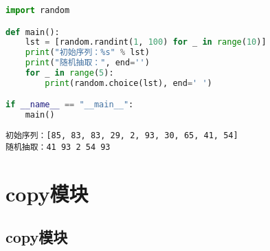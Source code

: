 \begin{table}[H]
	\centering
	\caption{random模块}
\end{table}


\begin{lstlisting}[language=Python]
import random

def main():
    lst = [random.randint(1, 100) for _ in range(10)]
    print("初始序列：%s" % lst)
    print("随机抽取：", end='')
    for _ in range(5):
        print(random.choice(lst), end=' ')

if __name__ == "__main__":
    main()
\end{lstlisting}

\begin{tcolorbox}
	\begin{verbatim}
初始序列：[85, 83, 83, 29, 2, 93, 30, 65, 41, 54]
随机抽取：41 93 2 54 93
\end{verbatim}
\end{tcolorbox}

\newpage

\section{copy模块}

\subsection{copy模块}

